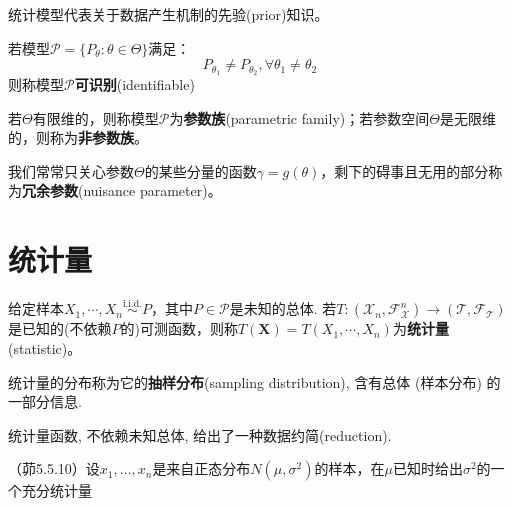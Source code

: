 统计模型代表关于数据产生机制的先验(prior)知识。

\begin{definition}[可识别]
      若模型$\mathcal{P}=\{ P_{\theta}:\theta \in \Theta \}$满足：
      \[ P_{\theta_1} \neq P_{\theta_2}, \forall \theta_1 \neq \theta_2 \]
      则称模型$\mathcal{P}$\textbf{可识别}(identifiable)
\end{definition}

\begin{definition}
      若$\Theta$有限维的，则称模型$\mathcal{P}$为\textbf{参数族}(parametric family)；若参数空间$\Theta$是无限维的，则称为\textbf{非参数族}。
\end{definition}

我们常常只关心参数$\Theta$的某些分量的函数$\gamma=g(\theta)$，剩下的碍事且无用的部分称为\textbf{冗余参数}(nuisance parameter)。

\section{统计量}

\begin{definition}[统计量]
      给定样本$X_1,\cdots ,X_n \overset{\text{i.i.d.}}{\sim} P$，其中$P \in \mathcal{P}$是未知的总体. 若$ T:(\mathcal{X}_n,\mathscr{F}^n_\mathcal{X})\to (\mathcal{T} ,\mathscr{F}_\mathcal{T})$是已知的(不依赖$P$的)可测函数，则称$T(\mathbf{X})=T(X_1,\cdots ,X_n)$为\textbf{统计量}(statistic)。
\end{definition}

\begin{definition}
      统计量的分布称为它的\textbf{抽样分布}(sampling distribution), 含有总体 (样本分布) 的一部分信息.
\end{definition}

统计量函数, 不依赖未知总体, 给出了一种数据约简(reduction). 

\begin{problemset}[错题记录]
      \item （茆5.5.10）设$x_1,\dotsc,x_n$是来自正态分布$N(\mu,\sigma^2)$的样本，在$\mu$已知时给出$\sigma^2$的一个充分统计量
  \end{problemset}
